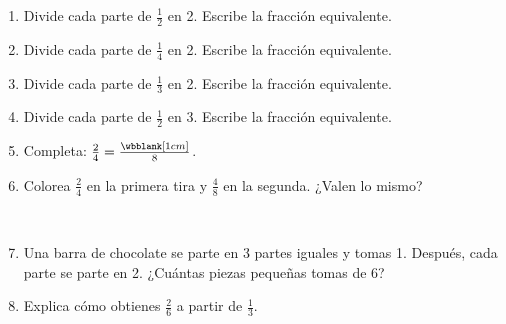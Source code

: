 \begin{wbpractice}
\begin{enumerate}
\item Divide cada parte de $\frac{1}{2}$ en 2. Escribe la fracción equivalente. \wbfracbox {}

\begin{center}
\end{center}

\item Divide cada parte de $\frac{1}{4}$ en 2. Escribe la fracción equivalente. \wbfracbox {}

\begin{center}
\end{center}

\item Divide cada parte de $\frac{1}{3}$ en 2. Escribe la fracción equivalente. \wbfracbox {}

\begin{center}
\end{center}

\item Divide cada parte de $\frac{1}{2}$ en 3. Escribe la fracción equivalente. \wbfracbox {}

\begin{center}
\end{center}

\item Completa: $\frac{2}{4}=\frac{\wbblank[1cm]}{8}$. 

\item Colorea $\frac{2}{4}$ en la primera tira y $\frac{4}{8}$ en la segunda. ¿Valen lo mismo? 

\begin{center}
\\[2pt]
\end{center}

\item Una barra de chocolate se parte en 3 partes iguales y tomas 1. Después, cada parte se parte en 2. ¿Cuántas piezas pequeñas tomas de 6? 

\item Explica cómo obtienes $\frac{2}{6}$ a partir de $\frac{1}{3}$. 
\end{enumerate}
\end{wbpractice}

